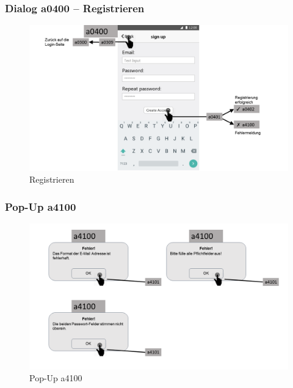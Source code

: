 \documentclass[a4paper,12pt,oneside]{scrartcl}
\begin{document}
\subsubsection{Dialog a0400 – Registrieren}
\begin{figure}[!htbp]
\centering
\noindent\includegraphics[width=\linewidth,height=\textheight,keepaspectratio]{Dialoge/a0400}
\caption{Registrieren}
\end{figure}
\FloatBarrier

\subsubsection{Pop-Up a4100}
\begin{figure}[!htbp]
\centering
\noindent\includegraphics[width=\linewidth,height=\textheight,keepaspectratio]{Dialoge/a0400p}
\caption{Pop-Up a4100}
\end{figure}
\FloatBarrier
\end{document}
